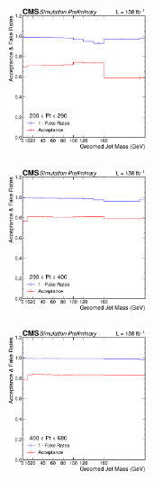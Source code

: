       \begin{figure}[htp!]
        \begin{subfigure}
          \centering
          \includegraphics[width=0.45\textwidth]{figures/multijet/trijet/fakerates_groomed_0.pdf}
        \end{subfigure} 
        \begin{subfigure}
          \centering
          \includegraphics[width=0.45\textwidth]{figures/multijet/trijet/fakerates_groomed_1.pdf}
        \end{subfigure}
        \begin{subfigure}
          \centering
          \includegraphics[width=0.45\textwidth]{figures/multijet/trijet/fakerates_groomed_2.pdf}
        \end{subfigure} 

\end{figure}
